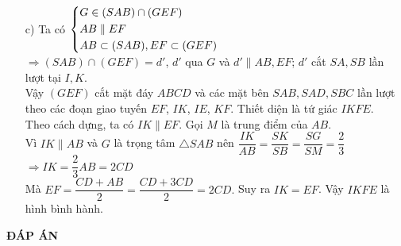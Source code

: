 \begin{bt}
{{
}
\begin{enumerate}
\item[c)] Ta có $\left\{\begin{aligned}&G\in (SAB)\cap (GEF)\\&AB\parallel EF\\&AB\subset (SAB), EF\subset (GEF)\end{aligned}\right.$\\
$\Rightarrow (SAB)\cap (GEF)=d'$, $d'$ qua $G$ và $d'\parallel AB, EF$; $d'$ cắt $SA, SB$ lần lượt tại $I, K$.\\
Vậy $(GEF)$ cắt mặt đáy $ABCD$ và các mặt bên $SAB, SAD, SBC$ lần lượt theo các đoạn giao tuyến $EF$, $IK$, $IE$, $KF$.
Thiết diện là tứ giác $IKFE$.\\
Theo cách dựng, ta có $IK\parallel EF$. Gọi $M$ là trung điểm của $AB$.\\
Vì $IK\parallel AB$ và $G$ là trọng tâm $\triangle SAB$ nên $\dfrac{IK}{AB}=\dfrac{SK}{SB}=\dfrac{SG}{SM}=\dfrac{2}{3}$
$\Rightarrow IK=\dfrac{2}{3}AB=2CD$\\
Mà $EF=\dfrac{CD+AB}{2}=\dfrac{CD+3CD}{2}=2CD.$
Suy ra $IK=EF$. Vậy $IKFE$ là hình bình hành.
\end{enumerate}
}
\end{bt}

\newpage
\begin{center}
	\textbf{ĐÁP ÁN}
\end{center}
\begin{multicols}{10}
	
\end{multicols}
